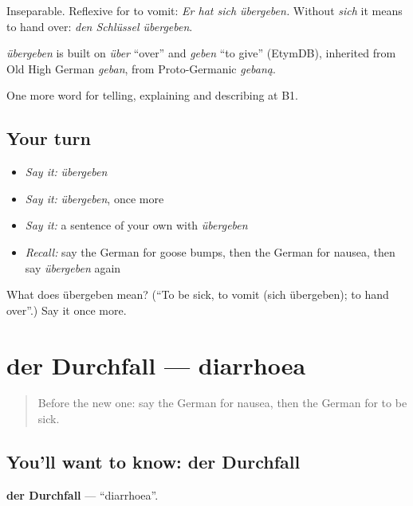 Inseparable. Reflexive for to vomit: \emph{Er hat sich übergeben.} Without \emph{sich} it means to hand over: \emph{den Schlüssel übergeben}.

\begin{cousinweb}
\emph{übergeben} is built on \emph{über} \textquotedblleft{}over\textquotedblright{} and \emph{geben} \textquotedblleft{}to give\textquotedblright{} (EtymDB), inherited from Old High German \emph{geban}, from Proto-Germanic \emph{gebaną}.
\end{cousinweb}

\begin{grammarlens}[title={What you've built}]
One more word for telling, explaining and describing at B1.
\end{grammarlens}

\subsection*{Your turn}
\begin{itemize}
\raggedright
  \item \emph{Say it:} \emph{übergeben}
  \item \emph{Say it:} \emph{übergeben}, once more
  \item \emph{Say it:} a sentence of your own with \emph{übergeben}
  \item \emph{Recall:} say the German for goose bumps, then the German for nausea, then say \emph{übergeben} again
\end{itemize}

\begin{tcolorbox}[breakable,colback=teal!4,colframe=teal!35!black,title={Before you move on}]
What does übergeben mean? (\textquotedblleft{}To be sick, to vomit (sich übergeben); to hand over\textquotedblright{}.) Say it once more.
\end{tcolorbox}
\section[der Durchfall]{der Durchfall — diarrhoea}

\label{lesson:GE-C480-durchfall}



\begin{quote}
Before the new one: say the German for nausea, then the German for to be sick.
\end{quote}

\subsection*{You'll want to know: der Durchfall}
\textbf{der Durchfall} — \textquotedblleft{}diarrhoea\textquotedblright{}.

